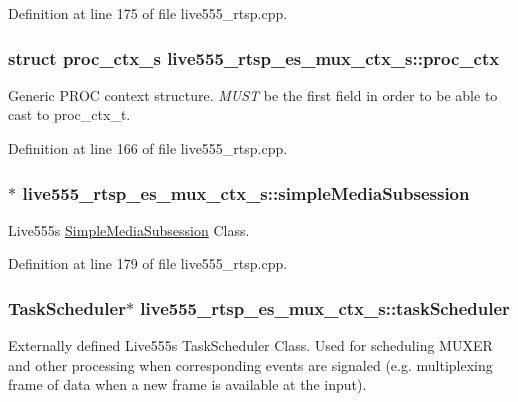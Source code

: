 Definition at line 175 of file live555\+\_\+rtsp.\+cpp.

\subsubsection[{\texorpdfstring{proc\+\_\+ctx}{proc_ctx}}]{\setlength{\rightskip}{0pt plus 5cm}struct {\bf proc\+\_\+ctx\+\_\+s} live555\+\_\+rtsp\+\_\+es\+\_\+mux\+\_\+ctx\+\_\+s\+::proc\+\_\+ctx}\hypertarget{structlive555__rtsp__es__mux__ctx__s_ad52255c06dde0cfdd45ec10c481fecb5}{}\label{structlive555__rtsp__es__mux__ctx__s_ad52255c06dde0cfdd45ec10c481fecb5}
Generic P\+R\+OC context structure. {\itshape M\+U\+ST} be the first field in order to be able to cast to proc\+\_\+ctx\+\_\+t. 

Definition at line 166 of file live555\+\_\+rtsp.\+cpp.

\subsubsection[{\texorpdfstring{simple\+Media\+Subsession}{simpleMediaSubsession}}]{$\ast$ live555\+\_\+rtsp\+\_\+es\+\_\+mux\+\_\+ctx\+\_\+s\+::simple\+Media\+Subsession}\hypertarget{structlive555__rtsp__es__mux__ctx__s_a066290959c314f7c0c51532b3124d644}{}\label{structlive555__rtsp__es__mux__ctx__s_a066290959c314f7c0c51532b3124d644}
Live555\textquotesingle{}s \hyperlink{classSimpleMediaSubsession}{Simple\+Media\+Subsession} Class. 

Definition at line 179 of file live555\+\_\+rtsp.\+cpp.

\subsubsection[{\texorpdfstring{task\+Scheduler}{taskScheduler}}]{\setlength{\rightskip}{0pt plus 5cm}Task\+Scheduler$\ast$ live555\+\_\+rtsp\+\_\+es\+\_\+mux\+\_\+ctx\+\_\+s\+::task\+Scheduler}\hypertarget{structlive555__rtsp__es__mux__ctx__s_a75ac022442f9544fc6a0d190257e37ee}{}\label{structlive555__rtsp__es__mux__ctx__s_a75ac022442f9544fc6a0d190257e37ee}
Externally defined Live555\textquotesingle{}s Task\+Scheduler Class. Used for scheduling M\+U\+X\+ER and other processing when corresponding events are signaled (e.\+g. multiplexing frame of data when a new frame is available at the input). 

